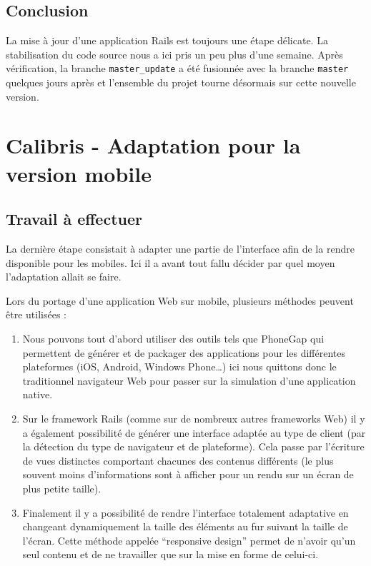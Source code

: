 \documentclass[12pt,a4paper]{book}
\begin{document}
\subsection*{Conclusion}

La mise à jour d'une application Rails est toujours une étape délicate. La stabilisation du code source nous a ici pris un peu plus d'une semaine. Après vérification, la branche \texttt{master\_update} a été fusionnée avec la branche \texttt{master} quelques jours après et l'ensemble du projet tourne désormais sur cette nouvelle version.

\section{Calibris - Adaptation pour la version mobile}

\label{section.mobile_dev}

\subsection{Travail à effectuer}

La dernière étape consistait à adapter une partie de l'interface afin de la rendre disponible pour les mobiles. Ici il a avant tout fallu décider par quel moyen l'adaptation allait se faire.

Lors du portage d'une application Web sur mobile, plusieurs méthodes peuvent être utilisées :
\begin{enumerate}
  \item Nous pouvons tout d'abord utiliser des outils tels que PhoneGap qui permettent de générer et de packager des applications pour les différentes plateformes (iOS, Android, Windows Phone…) ici nous quittons donc le traditionnel navigateur Web pour passer sur la simulation d'une application native.
  \item Sur le framework Rails (comme sur de nombreux autres frameworks Web) il y a également possibilité de générer une interface adaptée au type de client (par la détection du type de navigateur et de plateforme). Cela passe par l'écriture de vues distinctes comportant chacunes des contenus différents (le plus souvent moins d'informations sont à afficher pour un rendu sur un écran de plus petite taille).
  \item Finalement il y a possibilité de rendre l'interface totalement adaptative en changeant dynamiquement la taille des éléments au fur suivant la taille de l'écran. Cette méthode appelée ``responsive design'' permet de n'avoir qu'un seul contenu et de ne travailler que sur la mise en forme de celui-ci.
\end{enumerate}
\end{document}
